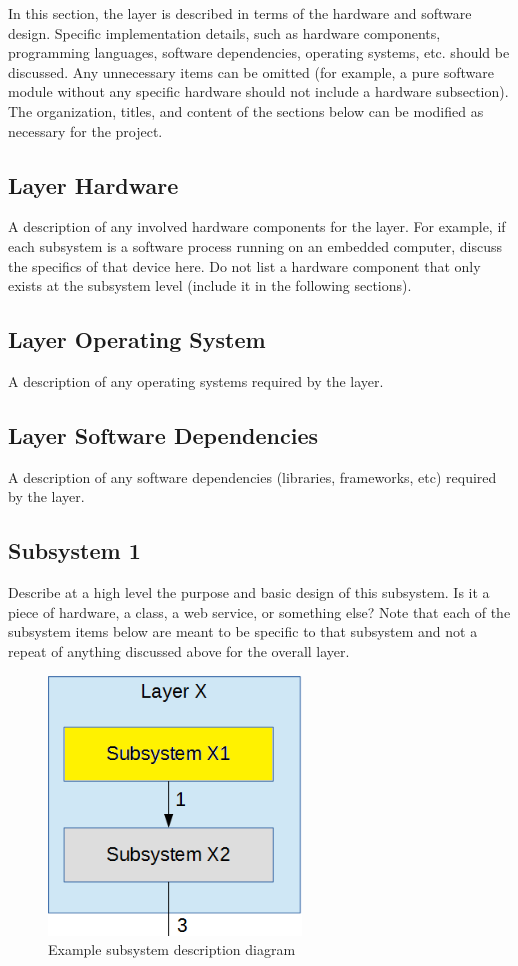 In this section, the layer is described in terms of the hardware and software design. Specific implementation details, such as hardware components, programming languages, software dependencies, operating systems, etc. should be discussed. Any unnecessary items can be omitted (for example, a pure software module without any specific hardware should not include a hardware subsection). The organization, titles, and content of the sections below can be modified as necessary for the project.

\subsection{Layer Hardware}
A description of any involved hardware components for the layer. For example, if each subsystem is a software process running on an embedded computer, discuss the specifics of that device here. Do not list a hardware component that only exists at the subsystem level (include it in the following sections).

\subsection{Layer Operating System}
A description of any operating systems required by the layer.

\subsection{Layer Software Dependencies}
A description of any software dependencies (libraries, frameworks, etc) required by the layer.

\subsection{Subsystem 1}
Describe at a high level the purpose and basic design of this subsystem. Is it a piece of hardware, a class, a web service, or something else? Note that each of the subsystem items below are meant to be specific to that subsystem and not a repeat of anything discussed above for the overall layer.

\begin{figure}[h!]
	\centering
 	\includegraphics[width=0.60\textwidth]{images/subsystem} %
 \caption{Example subsystem description diagram} %
\end{figure}

